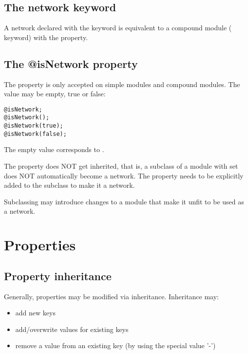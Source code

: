 \subsection{The network keyword}

A network declared with the  keyword is equivalent to a compound
module ( keyword) with the  property.

\subsection{The @isNetwork property}

The  property is only accepted on simple modules and
compound modules. The value may be empty, true or false:

\begin{verbatim}
@isNetwork;
@isNetwork();
@isNetwork(true);
@isNetwork(false);
\end{verbatim}

The empty value corresponds to .

The  property does NOT get inherited, that is, a subclass
of a module with  set does NOT automatically become a network.
The  property needs to be explicitly added to the subclass
to make it a network.

\begin{rationale}
    Subclassing may introduce changes to a module that make it unfit to be used
    as a network.
\end{rationale}



\section{Properties}

\subsection{Property inheritance}

Generally, properties may be modified via inheritance. Inheritance may:

\begin{itemize}
    \item add new keys
    \item add/overwrite values for existing keys
    \item remove a value from an existing key (by using the special value '-')
\end{itemize}



